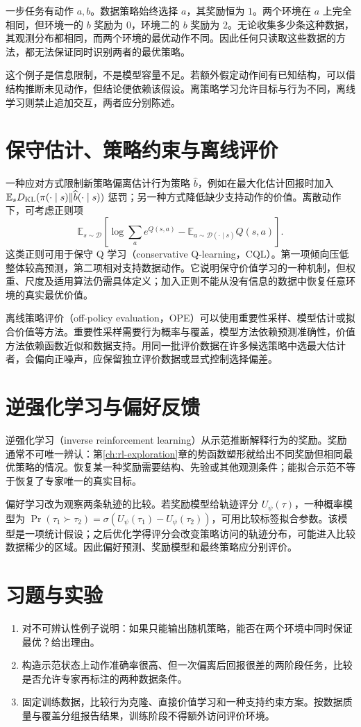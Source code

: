 \begin{example}[无限数据也未必足够]
一步任务有动作 $a,b$。数据策略始终选择 $a$，其奖励恒为 $1$。两个环境在 $a$ 上完全相同，但环境一的 $b$ 奖励为 $0$，环境二的 $b$ 奖励为 $2$。无论收集多少条这种数据，其观测分布都相同，而两个环境的最优动作不同。因此任何只读取这些数据的方法，都无法保证同时识别两者的最优策略。
\end{example}

这个例子是信息限制，不是模型容量不足。若额外假定动作间有已知结构，可以借结构推断未见动作，但结论便依赖该假设。离策略学习允许目标与行为不同，离线学习则禁止追加交互，两者应分别陈述。

\section{保守估计、策略约束与离线评价}

一种应对方式限制新策略偏离估计行为策略 $\widehat b$，例如在最大化估计回报时加入 $\mathbb E_sD_{\rm KL}(\pi(\cdot\mid s)\|\widehat b(\cdot\mid s))$ 惩罚；另一种方式降低缺少支持动作的价值。离散动作下，可考虑正则项
\[
\mathbb E_{s\sim\mathcal D}\left[\log\sum_a e^{Q(s,a)}-\mathbb E_{a\sim\mathcal D(\cdot\mid s)}Q(s,a)\right].
\]
这类正则可用于保守 Q 学习（conservative Q-learning，CQL）\cite{kumar-cql}。第一项倾向压低整体较高预测，第二项相对支持数据动作。它说明保守价值学习的一种机制，但权重、尺度及适用算法仍需具体定义；加入正则不能从没有信息的数据中恢复任意环境的真实最优价值。

离线策略评价（off-policy evaluation，OPE）可以使用重要性采样、模型估计或拟合价值等方法。重要性采样需要行为概率与覆盖，模型方法依赖预测准确性，价值方法依赖函数近似和数据支持。用同一批评价数据在许多候选策略中选最大估计者，会偏向正噪声，应保留独立评价数据或显式控制选择偏差。

\section{逆强化学习与偏好反馈}

逆强化学习（inverse reinforcement learning）从示范推断解释行为的奖励。奖励通常不可唯一辨认：第\ref{ch:rl-exploration}章的势函数塑形就给出不同奖励但相同最优策略的情况。恢复某一种奖励需要结构、先验或其他观测条件；能拟合示范不等于恢复了专家唯一的真实目标。

偏好学习改为观察两条轨迹的比较。若奖励模型给轨迹评分 $U_\psi(\tau)$，一种概率模型为 $\Pr(\tau_1\succ\tau_2)=\sigma(U_\psi(\tau_1)-U_\psi(\tau_2))$，可用比较标签拟合参数。该模型是一项统计假设；之后优化学得评分会改变策略访问的轨迹分布，可能进入比较数据稀少的区域。因此偏好预测、奖励模型和最终策略应分别评价。

\section{习题与实验}
\begin{enumerate}
\item 对不可辨认性例子说明：如果只能输出随机策略，能否在两个环境中同时保证最优？给出理由。
\item 构造示范状态上动作准确率很高、但一次偏离后回报很差的两阶段任务，比较是否允许专家再标注的两种数据条件。
\item 固定训练数据，比较行为克隆、直接价值学习和一种支持约束方案。按数据质量与覆盖分组报告结果，训练阶段不得额外访问评价环境。
\end{enumerate}





